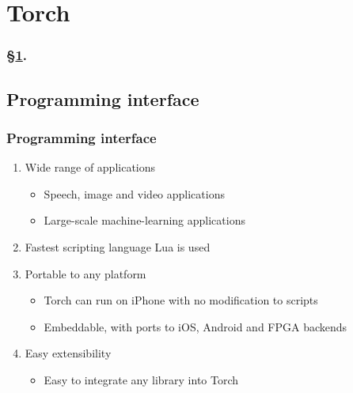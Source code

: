 
\section{Torch}\label{sec:Torch}


\frameinlbffalse

{

\begin{frame}[plain]
\frametitle{\S\ref{sec:Torch}. \insertsection}
\listofframes
\end{frame}
\addtocounter{framenumber}{-1} %

}

\frameinlbftrue

\subsection{Programming interface}

\begin{frame}
  \MyLogo
  \frametitle{Programming interface}  
\begin{enumerate}
\item Wide range of applications
\begin{itemize}
\item Speech, image and video applications
\item  Large-scale machine-learning applications
\end{itemize}
\item Fastest scripting language Lua is used
\item Portable to any platform
\begin{itemize}
\item Torch can run on iPhone with no modification to scripts
\item Embeddable, with ports to iOS, Android and FPGA backends
\end{itemize}
\item Easy extensibility
\begin{itemize}
\item Easy to integrate any library into Torch
\end{itemize}
\end{enumerate}
\end{frame}

